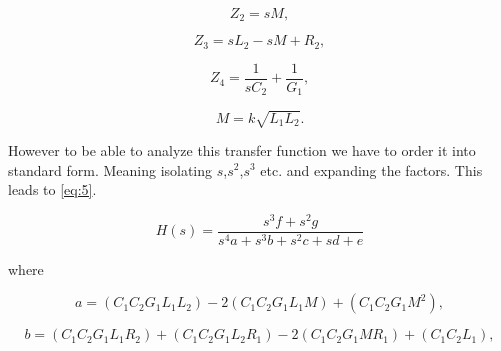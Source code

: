\begin{equation} \label{eq:4_2}
    Z_2 = s M,
\end{equation}

\begin{equation} \label{eq:4_3}
    Z_3 = s L_2 - s M + R_2,
\end{equation}

\begin{equation} \label{eq:4_4}
    Z_4 = \frac{1}{s C_2} + \frac{1}{G_1},
\end{equation}

\begin{equation} \label{eq:4_5}
    M = k \sqrt{L_1 L_2}.
\end{equation}


However to be able to analyze this transfer function we have to order it into standard form. Meaning isolating $s$,$s^2$,$s^3$ etc. and expanding the factors. This leads to \cref{eq:5}.


\begin{equation} \label{eq:5}
    H(s) = \frac{s^3 f + s^2 g}{s^4 a + s^3 b + s^2 c + s d + e}
\end{equation}

where

\begin{equation} \label{eq:5_1}
    a = (C_1 C_2 G_1 L_1 L_2)-2 (C_1 C_2 G_1 L_1 M)+(C_1 C_2 G_1 M^2),
\end{equation}

\begin{equation} \label{eq:5_2}
    b = (C_1 C_2 G_1 L_1 R_2)+(C_1 C_2 G_1 L_2 R_1)-2 (C_1 C_2 G_1 M R_1)+(C_1 C_2 L_1),
\end{equation}

